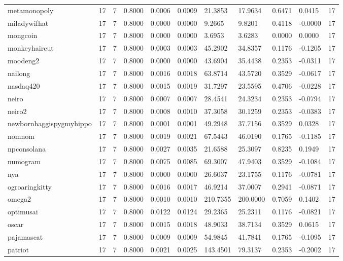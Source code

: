 \begin{table}[htbp]
\begin{tabular}{lllllllllll}
metamonopoly & 17 & 7 & 0.8000 & 0.0006 & 0.0009 & 21.3853 & 17.9634 & 0.6471 & 0.0415 & 17 \\
miladywifhat & 17 & 7 & 0.8000 & 0.0000 & 0.0000 & 9.2665 & 9.8201 & 0.4118 & -0.0000 & 17 \\
mongcoin & 17 & 7 & 0.8000 & 0.0000 & 0.0000 & 3.6953 & 3.6283 & 0.0000 & 0.0000 & 17 \\
monkeyhaircut & 17 & 7 & 0.8000 & 0.0003 & 0.0003 & 45.2902 & 34.8357 & 0.1176 & -0.1205 & 17 \\
moodeng2 & 17 & 7 & 0.8000 & 0.0000 & 0.0000 & 43.6904 & 35.4438 & 0.2353 & -0.0311 & 17 \\
nailong & 17 & 7 & 0.8000 & 0.0016 & 0.0018 & 63.8714 & 43.5720 & 0.3529 & -0.0617 & 17 \\
nasdaq420 & 17 & 7 & 0.8000 & 0.0015 & 0.0019 & 31.7297 & 23.5595 & 0.4706 & -0.0228 & 17 \\
neiro & 17 & 7 & 0.8000 & 0.0007 & 0.0007 & 28.4541 & 24.3234 & 0.2353 & -0.0794 & 17 \\
neiro2 & 17 & 7 & 0.8000 & 0.0008 & 0.0010 & 37.3058 & 30.1259 & 0.2353 & -0.0383 & 17 \\
newbornhaggispygmyhippo & 17 & 7 & 0.8000 & 0.0001 & 0.0001 & 49.2948 & 37.7156 & 0.3529 & 0.0328 & 17 \\
nomnom & 17 & 7 & 0.8000 & 0.0019 & 0.0021 & 67.5443 & 46.0190 & 0.1765 & -0.1185 & 17 \\
npconsolana & 17 & 7 & 0.8000 & 0.0027 & 0.0035 & 21.6588 & 25.3097 & 0.8235 & 0.1949 & 17 \\
numogram & 17 & 7 & 0.8000 & 0.0075 & 0.0085 & 69.3007 & 47.9403 & 0.3529 & -0.1084 & 17 \\
nya & 17 & 7 & 0.8000 & 0.0000 & 0.0000 & 26.6037 & 23.1755 & 0.1176 & -0.0781 & 17 \\
ogroaringkitty & 17 & 7 & 0.8000 & 0.0016 & 0.0017 & 46.9214 & 37.0007 & 0.2941 & -0.0871 & 17 \\
omega2 & 17 & 7 & 0.8000 & 0.0010 & 0.0010 & 210.7355 & 200.0000 & 0.7059 & 0.1402 & 17 \\
optimusai & 17 & 7 & 0.8000 & 0.0122 & 0.0124 & 29.2365 & 25.2311 & 0.1176 & -0.0821 & 17 \\
oscar & 17 & 7 & 0.8000 & 0.0015 & 0.0018 & 48.9033 & 38.7134 & 0.3529 & 0.0615 & 17 \\
pajamascat & 17 & 7 & 0.8000 & 0.0009 & 0.0009 & 54.9845 & 41.7841 & 0.1765 & -0.1095 & 17 \\
patriot & 17 & 7 & 0.8000 & 0.0021 & 0.0025 & 143.4501 & 79.3137 & 0.2353 & -0.2002 & 17 \\

\end{tabular}
\end{table}

